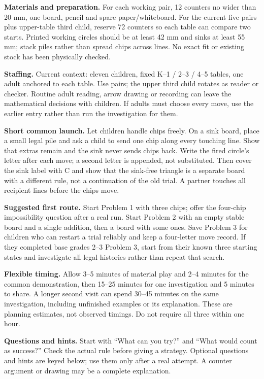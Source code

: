 \documentclass[11pt]{article}
\begin{document}
\textbf{Materials and preparation.} For each working pair, 12 counters no wider than 20 mm, one board, pencil and spare paper/whiteboard. For the current five pairs plus upper-table third child, reserve 72 counters so each table can compare two starts. Printed working circles should be at least 42 mm and sinks at least 55 mm; stack piles rather than spread chips across lines. No exact fit or existing stock has been physically checked.

\textbf{Staffing.} Current context: eleven children, fixed K--1 / 2--3 / 4--5 tables, one adult anchored to each table. Use pairs; the upper third child rotates as reader or checker. Routine adult reading, arrow drawing or recording can leave the mathematical decisions with children. If adults must choose every move, use the earlier entry rather than run the investigation for them.

\textbf{Short common launch.} Let children handle chips freely. On a sink board, place a small legal pile and ask a child to send one chip along every touching line. Show that extras remain and the sink never sends chips back. Write the fired circle’s letter after each move; a second letter is appended, not substituted. Then cover the sink label with C and show that the sink-free triangle is a separate board with a different rule, not a continuation of the old trial. A partner touches all recipient lines before the chips move.

\textbf{Suggested first route.} Start Problem 1 with three chips; offer the four-chip impossibility question after a real run. Start Problem 2 with an empty stable board and a single addition, then a board with some ones. Save Problem 3 for children who can restart a trial reliably and keep a four-letter move record. If they completed base grades 2--3 Problem 3, start from their known three starting states and investigate all legal histories rather than repeat that search.

\textbf{Flexible timing.} Allow 3--5 minutes of material play and 2--4 minutes for the common demonstration, then 15--25 minutes for one investigation and 5 minutes to share. A longer second visit can spend 30--45 minutes on the same investigation, including unfinished examples or its explanation. These are planning estimates, not observed timings. Do not require all three within one hour.

\textbf{Questions and hints.} Start with ``What can you try?'' and ``What would count as success?'' Check the actual rule before giving a strategy. Optional questions and hints are keyed below; use them only after a real attempt. A counter argument or drawing may be a complete explanation.
\end{document}
